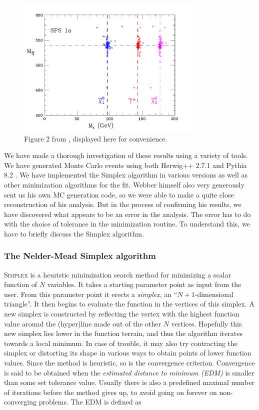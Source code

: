 \documentclass[twoside,english]{uiofysmaster}
\begin{document}
\begin{figure}[hbt]
	\centering
	\includegraphics[width=0.8\textwidth]{figures/webber_rec_table/webber_scatter.png} 
	\caption{Figure 2 from \cite{Webber:2009vm}, displayed here for convenience.}
	\label{fig:webber_scatter}
\end{figure}

We have made a thorough investigation of these results using a variety of tools. We have generated Monte Carlo events using both Herwig++ 2.7.1  \cite{Bahr:2008pv} and Pythia 8.2 \cite{Sjostrand:2014zea}. We have implemented the Simplex algorithm in various versions as well as other minimization algorithms for the fit. Webber himself also very generously sent us his own MC generation code, so we were able to make a quite close reconstruction of his analysis. But in the process of confirming his results, we have discovered what appears to be an error in the analysis. The error has to do with the choice of tolerance in the minimization routine. To understand this, we have to briefly discuss the Simplex algorithm.

\subsubsection{The Nelder-Mead Simplex algorithm}

{\scshape Simplex} \cite{nelder1965simplex} is a heuristic minimization search method for minimizing a scalar function of $N$ variables. It takes a starting parameter point as input from the user. From this parameter point it erects a {\it simplex}, an ``$N+1$-dimensional triangle''. It then begins to evaluate the function in the vertices of this simplex. A new simplex is constructed by reflecting the vertex with the highest function value around the (hyper)line made out of the other $N$ vertices. Hopefully this new simplex lies lower in the function terrain, and thus the algorithm iterates towards a local minimum. In case of trouble, it may also try contracting the simplex or distorting its shape in various ways to obtain points of lower function values. Since the method is heuristic, so is the convergence criterion. Convergence is said to be obtained when the {\it estimated distance to minimum (EDM)} is smaller than some set tolerance value. Usually there is also a predefined maximal number of iterations before the method gives up, to avoid going on forever on non-converging problems. The EDM is defined as
\end{document}
